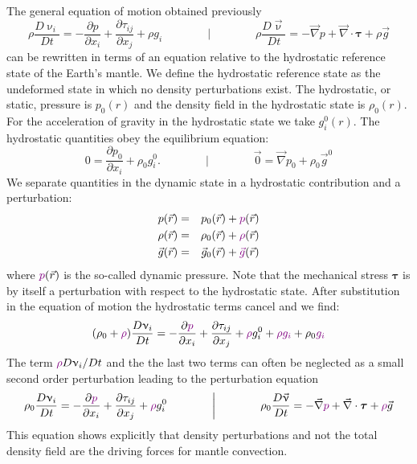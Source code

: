 The general equation of motion obtained previously
\begin{equation}
\rho \frac{D\upnu_i}{Dt} = -\frac{\partial p}{\partial x_i} + 
\frac{\partial \tau_{ij}}{\partial x_j} + \rho g_i
\qquad
\qquad
\bigg\rvert
\qquad
\qquad
\rho \frac{D\vec\upnu}{Dt} = -\vec\nabla p + \vec\nabla \cdot {\bm \tau} + \rho \vec{g}
\end{equation}
can be rewritten in terms
of an equation relative to the hydrostatic reference state of the Earth's mantle. We define
the hydrostatic reference state as the undeformed state in which no density perturbations
exist. The hydrostatic, or static, pressure is $p_0(r)$ and the density field in the hydrostatic
state is $\rho_0(r)$. For the acceleration of gravity in the hydrostatic state we take $g_i^0(r)$. 
The hydrostatic quantities obey the equilibrium equation: 
\begin{equation}
0 = \frac{\partial p_0}{\partial x_i} + \rho_0 g_i^0.
\qquad
\qquad
\bigg\rvert
\qquad
\qquad
\vec{0} = \vec\nabla p_0 + \rho_0 \vec{g}^0
\end{equation}
We separate quantities in the dynamic state in a hydrostatic contribution and a
perturbation:
\begin{eqnarray}
p(\vec{r}) &=& p_0(\vec{r}) + {\color{violet} p}(\vec{r}) \nonumber\\
\rho(\vec{r}) &=& \rho_0(\vec{r}) + {\color{violet}\rho}(\vec{r}) \nonumber\\
\vec{g}(\vec{r}) &=& \vec{g}_0(\vec{r}) + {\color{violet}\vec{g}}(\vec{r}) \nonumber
\end{eqnarray}
where ${\color{violet} p}(\vec{r})$ is the so-called dynamic pressure.
Note that the mechanical stress ${\bm \tau}$ is by
itself a perturbation with respect to the hydrostatic state. After substitution in the equation
of motion the hydrostatic terms cancel and we find:
\begin{equation}
(\rho_0 + {\color{violet}\rho})  \frac{D\upnu_i}{Dt}
= -\frac{\partial {\color{violet} p}}{\partial x_i} + \frac{\partial \tau_{ij}}{\partial x_j}
+ {\color{violet} \rho} g_i^0 +  {\color{violet} \rho} {\color{violet} g_i}
+ \rho_0  {\color{violet} g_i}
\label{eq:md34a}
\end{equation}
The term $ {\color{violet}\rho} D\upnu_i/Dt$ and the the last two terms can often be 
neglected as a small second order
perturbation leading to the perturbation equation
\begin{equation}
\rho_0   \frac{D\upnu_i}{Dt}
= -\frac{\partial {\color{violet} p}}{\partial x_i} + \frac{\partial \tau_{ij}}{\partial x_j}
+ {\color{violet} \rho} g_i^0 
\qquad
\qquad
\bigg\rvert
\qquad
\qquad
\rho_0   \frac{D\vec\upnu}{Dt}
=
-\vec\nabla {\color{violet} p} + \vec\nabla \cdot {\bm \tau} + {\color{violet}\rho} \vec{g}
\label{eq:md34b}
\end{equation}
This equation shows explicitly that density perturbations and not the total density field
are the driving forces for mantle convection.

